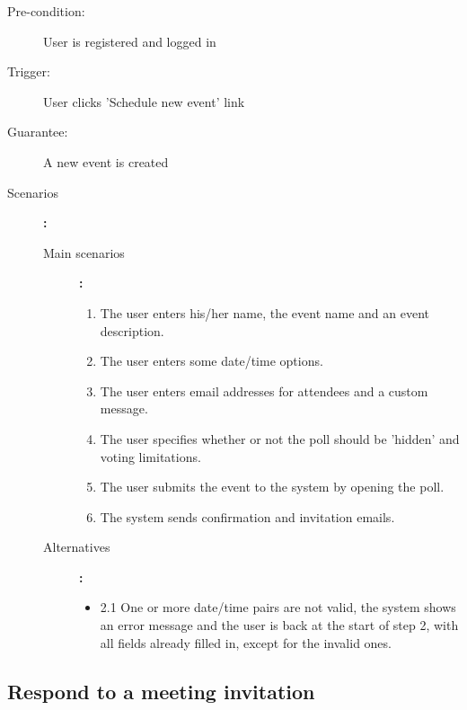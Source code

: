 \begin{description}
	\item[Pre-condition:] User is registered and logged in
	\item[Trigger:] User clicks 'Schedule new event' link
	\item[Guarantee:] A new event is created
	\item[Scenarios]\textbf{:}\\
				\begin{description}
					\item[Main scenarios]\textbf{:}\\
								\begin{enumerate}
									\item The user enters his/her name, the event name and an event description.
									\item The user enters some date/time options.
									\item The user enters email addresses for attendees and a custom message.
									\item The user specifies whether or not the poll should be 'hidden' and voting limitations.
									\item The user submits the event to the system by opening the poll.
									\item The system sends confirmation and invitation emails.
								\end{enumerate}
					\item[Alternatives]\textbf{:}\\
								\begin{itemize}
									\item 2.1 One or more date/time pairs are not valid, the system shows an error message and the user is back at the start of step 2, with all fields already filled in, except for the invalid ones.
								\end{itemize}
				\end{description}
\end{description}
\pagebreak

\subsection{Respond to a meeting invitation}

